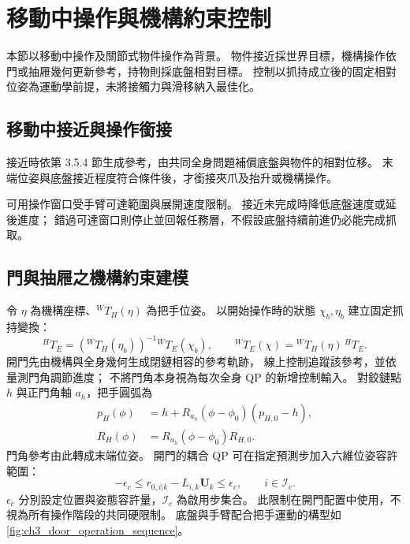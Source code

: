 \section{移動中操作與機構約束控制}
\label{sec:mobile_constrained_operation}

本節以移動中操作\cite{burgess2023motm}及關節式物件操作\cite{mittal2022articulated}為背景。
物件接近採世界目標，機構操作依門或抽屜幾何更新參考，持物則採底盤相對目標。
控制以抓持成立後的固定相對位姿為運動學前提，未將接觸力與滑移納入最佳化。

\subsection{移動中接近與操作銜接}
\label{subsec:moving_approach_grasp}

接近時依第 3.5.4 節生成參考，由共同全身問題補償底盤與物件的相對位移。
末端位姿與底盤接近程度符合條件後，才銜接夾爪及抬升或機構操作。

可用操作窗口受手臂可達範圍與展開速度限制。
接近未完成時降低底盤速度或延後進度；
錯過可達窗口則停止並回報任務層，不假設底盤持續前進仍必能完成抓取。

\subsection{門與抽屜之機構約束建模}
\label{subsec:articulated_object_constraints}

令 $\eta$ 為機構座標、$ {}^WT_H(\eta)$ 為把手位姿。
以開始操作時的狀態 $\chi_b,\eta_b$ 建立固定抓持變換：
\begin{equation}
    {}^HT_E=({}^WT_H(\eta_b))^{-1}{}^WT_E(\chi_b),
    \qquad
    {}^WT_E(\chi)={}^WT_H(\eta)\,{}^HT_E .
    \label{eq:ch3_grasp_closed_chain}
\end{equation}
開門先由機構與全身幾何生成閉鏈相容的參考軌跡，
線上控制追蹤該參考，並依量測門角調節進度；
不將門角本身視為每次全身 QP 的新增控制輸入。
對鉸鏈點 $h$ 與正門角軸 $a_h$，把手圓弧為
\begin{equation}
    \begin{aligned}
        p_H(\phi)&=h+R_{a_h}(\phi-\phi_0)(p_{H,0}-h),\\
        R_H(\phi)&=R_{a_h}(\phi-\phi_0)R_{H,0}.
    \end{aligned}
    \label{eq:ch3_revolute_handle_model}
\end{equation}
門角參考由此轉成末端位姿。
開門的耦合 QP 可在指定預測步加入六維位姿容許範圍：
\begin{equation}
    -\epsilon_c\leq r_{0,i|k}-L_{i,k}\mathbf U_k\leq\epsilon_c,
    \qquad i\in\mathcal I_c .
    \label{eq:ch3_contact_pose_tube}
\end{equation}
$\epsilon_c$ 分別設定位置與姿態容許量，$\mathcal I_c$ 為啟用步集合。
此限制在開門配置中使用，不視為所有操作階段的共同硬限制。
底盤與手臂配合把手運動的構型如\cref{fig:ch3_door_operation_sequence}。

